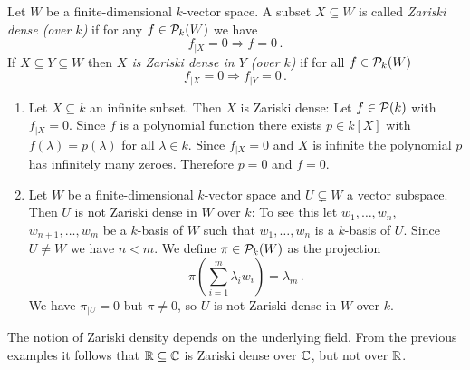 \begin{definition}
  Let $W$ be a finite-dimensional $k$-vector space.
  A subset $X \subseteq W$ is called \emph{Zariski dense (over $k$)} if for any $f \in \mathcal{P}_k(W)$ we have
  \[
                f_{|X} = 0
    \Rightarrow f = 0 \,.
  \]
  If $X \subseteq Y \subseteq W$ then \emph{$X$ is Zariski dense in $Y$ (over $k$)} if for all $f \in \mathcal{P}_k(W)$
  \[
                f_{|X} = 0
    \Rightarrow f_{|Y} = 0 \,.
  \]
\end{definition}


\begin{expls}
  \begin{enumerate}[label=\emph{\alph*)},leftmargin=*]
    \item 
      Let $X \subseteq k$ an infinite subset.
      Then $X$ is Zariski dense:
      Let $f \in \mathcal{P}(k)$ with $f_{|X} = 0$.
      Since $f$ is a polynomial function there exists $p \in k[X]$ with $f(\lambda) = p(\lambda)$ for all $\lambda \in k$.
      Since $f_{|X} = 0$ and $X$ is infinite the polynomial $p$ has infinitely many zeroes.
      Therefore $p = 0$ and $f = 0$.
    \item
      Let $W$ be a finite-dimensional $k$-vector space and $U \subsetneq W$ a vector subspace.
      Then $U$ is not Zariski dense in $W$ over $k$:
      To see this let $w_1, \dotsc, w_n$, $w_{n+1}, \dotsc, w_m$ be a $k$-basis of $W$ such that $w_1, \dotsc, w_n$ is a $k$-basis of $U$.
      Since $U \neq W$ we have $n < m$.
      We define $\pi \in \mathcal{P}_k(W)$ as the projection
      \[
          \pi\left( \sum_{i=1}^m \lambda_i w_i \right)
        = \lambda_m \,.
      \]
      We have $\pi_{|U} = 0$ but $\pi \neq 0$, so $U$ is not Zariski dense in $W$ over $k$.
  \end{enumerate}
\end{expls}


\begin{warn}
  The notion of Zariski density depends on the underlying field.
  From the previous examples it follows that $\mathbb{R} \subseteq \mathbb{C}$ is Zariski dense over $\mathbb{C}$, but not over $\mathbb{R}$.
\end{warn}



